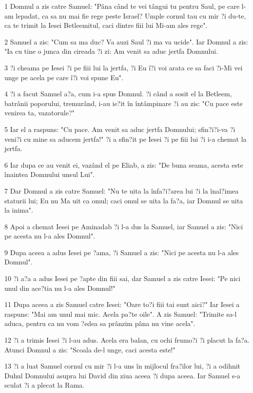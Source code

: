 \par 1 Domnul a zis catre Samuel: "Pâna când te vei tângui tu pentru Saul, pe care l-am lepadat, ca sa nu mai fie rege peste Israel? Umple cornul tau cu mir ?i du-te, ca te trimit la Iesei Betleemitul, caci dintre fiii lui Mi-am ales rege".
\par 2 Samuel a zis: "Cum sa ma duc? Va auzi Saul ?i ma va ucide". Iar Domnul a zis: "Ia cu tine o junca din cireada ?i zi: Am venit sa aduc jertfa Domnului.
\par 3 ?i cheama pe Iesei ?i pe fiii lui la jertfa, ?i Eu î?i voi arata ce sa faci ?i-Mi vei unge pe acela pe care î?i voi spune Eu".
\par 4 ?i a facut Samuel a?a, cum i-a spus Domnul. ?i când a sosit el la Betleem, batrânii poporului, tremurând, i-au ie?it în întâmpinare ?i au zis: "Cu pace este venirea ta, vazatorule?"
\par 5 Iar el a raspuns: "Cu pace. Am venit sa aduc jertfa Domnului; sfin?i?i-va ?i veni?i cu mine sa aducem jertfa!" ?i a sfin?it pe Iesei ?i pe fiii lui ?i i-a chemat la jertfa.
\par 6 Iar dupa ce au venit ei, vazând el pe Eliab, a zis: "De buna seama, acesta este înaintea Domnului unsul Lui".
\par 7 Dar Domnul a zis catre Samuel: "Nu te uita la înfa?i?area lui ?i la înal?imea staturii lui; Eu nu Ma uit ca omul; caci omul se uita la fa?a, iar Domnul se uita la inima".
\par 8 Apoi a chemat Iesei pe Aminadab ?i l-a dus la Samuel, iar Samuel a zis: "Nici pe acesta nu l-a ales Domnul".
\par 9 Dupa aceea a adus Iesei pe ?ama, ?i Samuel a zis: "Nici pe acesta nu l-a ales Domnul".
\par 10 ?i a?a a adus Iesei pe ?apte din fiii sai, dar Samuel a zis catre Iesei: "Pe nici unul din ace?tia nu l-a ales Domnul!"
\par 11 Dupa aceea a zis Samuel catre Iesei: "Oare to?i fiii tai sunt aici?" Iar Iesei a raspuns: "Mai am unul mai mic. Acela pa?te oile". A zis Samuel: "Trimite sa-l aduca, pentru ca nu vom ?edea sa prânzim pâna nu vine acela".
\par 12 ?i a trimis Iesei ?i l-au adus. Acela era balan, cu ochi frumo?i ?i placut la fa?a. Atunci Domnul a zis: "Scoala de-l unge, caci acesta este!"
\par 13 ?i a luat Samuel cornul cu mir ?i l-a uns în mijlocul fra?ilor lui, ?i a odihnit Duhul Domnului asupra lui David din ziua aceea ?i dupa aceea. Iar Samuel s-a sculat ?i a plecat la Rama.
